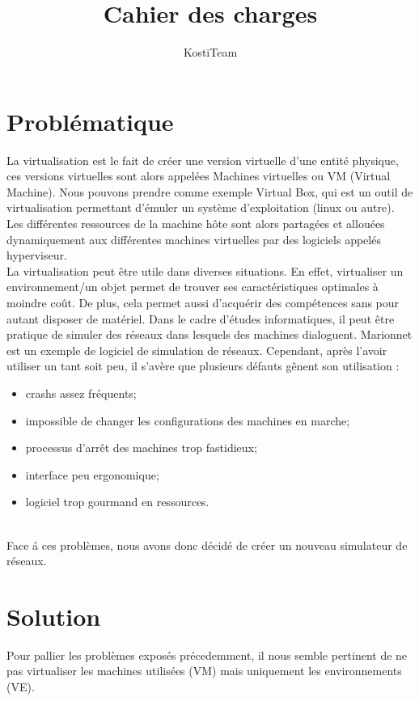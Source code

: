 \documentclass[a4paper]{article}
\author{KostiTeam}
\title{Cahier des charges}
\begin{document}
\maketitle
\newpage
\tableofcontents
\newpage

\section{Probl\'ematique}
La virtualisation est le fait de cr\'eer une version virtuelle d'une entit\'e physique, ces versions virtuelles
sont alors appel\'ees Machines virtuelles ou VM (Virtual Machine). Nous 
pouvons prendre comme exemple Virtual Box, qui est un outil de virtualisation 
permettant d'\'emuler un syst\`eme d'exploitation (linux ou autre). Les diff\'erentes ressources de la machine 
h\^ote sont alors partag\'ees et allou\'ees dynamiquement aux diff\'erentes machines virtuelles par des logiciels
appel\'es hyperviseur.\\

La virtualisation peut \^etre utile dans diverses situations. En effet, virtualiser un environnement/un objet permet de trouver ses caract\'eristiques optimales \`a moindre co\^ut. De plus, cela permet aussi d'acqu\'erir des comp\'etences sans pour autant disposer de mat\'eriel. Dans le cadre d'\'etudes informatiques, il peut \^etre pratique de simuler des r\'eseaux dans lesquels des machines dialoguent. Marionnet est un exemple de logiciel de simulation de r\'eseaux. Cependant, apr\`es l'avoir utiliser un tant soit peu, il s'av\`ere que plusieurs d\'efauts g\^enent son utilisation : 
\begin{itemize}
  \item crashs assez fr\'equents;
  \item impossible de changer les configurations des machines en marche;
  \item processus d'arr\^et des machines trop fastidieux;
  \item interface peu ergonomique;
  \item logiciel trop gourmand en ressources.
\end{itemize}

\\
Face \'a ces probl\`emes, nous avons donc d\'ecid\'e de cr\'eer un nouveau simulateur de r\'eseaux.

\section{Solution}
Pour pallier les probl\`emes expos\'es pr\'ecedemment, il nous semble pertinent de ne pas virtualiser les machines utilis\'ees  (VM) mais uniquement les environnements (VE).\\
\end{document}
